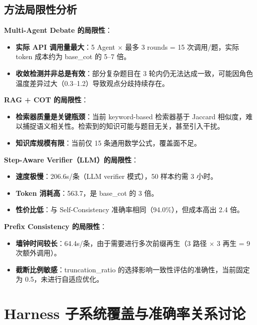 \documentclass[lang=cn,a4paper,newtx]{elegantpaper}
\begin{document}
\subsection{方法局限性分析}

\textbf{Multi-Agent Debate 的局限性}：

\begin{itemize}
  \item \textbf{实际 API 调用量最大}：5 Agent $\times$ 最多 3 rounds = 15 次调用/题，实际 token 成本约为 base\_cot 的 5--7 倍。
  \item \textbf{收敛检测并非总是有效}：部分复杂题目在 3 轮内仍无法达成一致，可能因角色温度差异过大（0.3--1.2）导致观点分歧持续存在。
\end{itemize}

\textbf{RAG + COT 的局限性}：

\begin{itemize}
  \item \textbf{检索器质量是关键瓶颈}：当前 keyword-based 检索器基于 Jaccard 相似度，难以捕捉语义相关性。检索到的知识可能与题目无关，甚至引入干扰。
  \item \textbf{知识库规模有限}：当前仅 15 条通用数学公式，覆盖面不足。
\end{itemize}

\textbf{Step-Aware Verifier（LLM）的局限性}：

\begin{itemize}
  \item \textbf{速度极慢}：206.6s/条（LLM verifier 模式），50 样本约需 3 小时。
  \item \textbf{Token 消耗高}：563.7，是 base\_cot 的 3 倍。
  \item \textbf{性价比低}：与 Self-Consistency 准确率相同（94.0\%），但成本高出 2.4 倍。
\end{itemize}

\textbf{Prefix Consistency 的局限性}：

\begin{itemize}
  \item \textbf{墙钟时间较长}：64.4s/条，由于需要进行多次前缀再生（3 路径 $\times$ 3 再生 = 9 次额外调用）。
  \item \textbf{截断比例敏感}：truncation\_ratio 的选择影响一致性评估的准确性，当前固定为 0.5，未进行自适应优化。
\end{itemize}

\section{Harness 子系统覆盖与准确率关系讨论}
\end{document}
